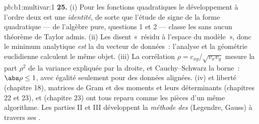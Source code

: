 \begin{solution}{pb:b1:multivar:1}
\textbf{25.} (i) Pour les fonctions quadratiques le développement
à l'ordre deux est une \emph{identité}, de sorte que l'étude de
signe de la forme quadratique --- de l'algèbre pure, questions 1
et 2 --- classe les  sans aucun théorème de Taylor
admis. (ii) Les  disent «~résidu  à
l'espace du modèle~», donc le minimum analytique \emph{est} la
 du vecteur de données~: l'analyse et la
géométrie euclidienne calculent le même objet. (iii) La
corrélation $\rho = c_{xy}/\sqrt{v_xv_y}$ mesure la part $\rho^2$
de la variance expliquée par la droite, et Cauchy--Schwarz la
borne~: $\abs\rho \leq 1$, avec égalité seulement pour des données
alignées. (iv)  et liberté (chapitre 18), matrices de Gram et
des moments et leurs déterminants (chapitres 22 et 23), et
 (chapitre 23) ont tous reparu comme les
pièces d'un même algorithme. Les parties II et III développent la
\emph{méthode des } (Legendre, Gauss) à travers ses
\emph{}.
\end{solution}
